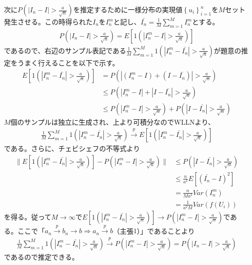 \documentclass{article}
\begin{document}
次に$P\left( | I_n - I | > \frac{a}{\sqrt{n}} \right)$を推定するために一様分布の実現値$\left\{ u_i \right\}_{i=1}^n$を$M$セット発生させる。この時得られた$I_n$を$I_n^m$と記し、$\bar{I_n} = \frac{1}{M} \sum_{m=1}^M I_n^m$とする。
\begin{align*}
	P\left( | I_n - I | > \frac{a}{\sqrt{n}} \right) = E\left[ 1\left(  | I_n^m - I | > \frac{a}{\sqrt{n}} \right) \right]
\end{align*}
であるので、右辺のサンプル表記である$\frac{1}{M} \sum_{m=1}^M 1\left(  | I_n^m - \bar{I_n} | > \frac{a}{\sqrt{n}} \right)$が題意の推定をうまく行えることを以下で示す。
\begin{align*}
	E\left[ 1\left(  | I_n^m - \bar{I_n} | > \frac{a}{\sqrt{n}} \right) \right] &= P\left( | (I_n^m - I) + (I - \bar{I_n}) |  > \frac{a}{\sqrt{n}} \right) \\
	&\leq P\left( | I_n^m - I |+ |I - \bar{I_n}|  > \frac{a}{\sqrt{n}} \right)\\
	& \leq P\left( | I_n^m - I |> \frac{a}{\sqrt{n}} \right) + P\left( |I - \bar{I_n}|  > \frac{a}{\sqrt{n}} \right)
\end{align*}
$M$個のサンプルは独立に生成され、上より可積分なのでWLLNより、
\begin{align*}
\frac{1}{M} \sum_{m=1}^M 1\left(  | I_n^m - \bar{I_n} | > \frac{a}{\sqrt{n}} \right) \xrightarrow{p} E\left[ 1\left(  | I_n^m - \bar{I_n} | > \frac{a}{\sqrt{n}} \right) \right]
\end{align*}
である。さらに、チェビシェフの不等式より
\begin{align*}
	\| E\left[ 1\left(  | I_n^m - \bar{I_n} | > \frac{a}{\sqrt{n}} \right) \right] - P\left( | I_n^m - I |> \frac{a}{\sqrt{n}} \right)  \| &\leq P\left( |I - \bar{I_n}|  > \frac{a}{\sqrt{n}} \right)\\
	&\leq \frac{n}{a^2} E\left[ \left( \bar{I_n} - I \right)^2 \right]\\
	&= \frac{n}{Ma^2} Var\left(I_n^m \right)\\
	&= \frac{1}{a^2M} Var\left( f(U_i) \right)
\end{align*}
を得る。従って$M\to \infty$で$E\left[ 1\left(  | I_n^m - \bar{I_n} | > \frac{a}{\sqrt{n}} \right) \right] \to P\left( | I_n^m - I |> \frac{a}{\sqrt{n}} \right)$である。ここで「$a_n \xrightarrow{p} b_n \to b \Rightarrow a_n \xrightarrow{p} b$（主張$1$）」であることより
\begin{align*}
	\frac{1}{M} \sum_{m=1}^M 1\left(  | I_n^m - \bar{I_n} | > \frac{a}{\sqrt{n}} \right) \xrightarrow{p} P\left( | I_n^m - I |> \frac{a}{\sqrt{n}} \right) = P\left( | I_n - I |> \frac{a}{\sqrt{n}} \right)
\end{align*}
であるので推定できる。
\end{document}
